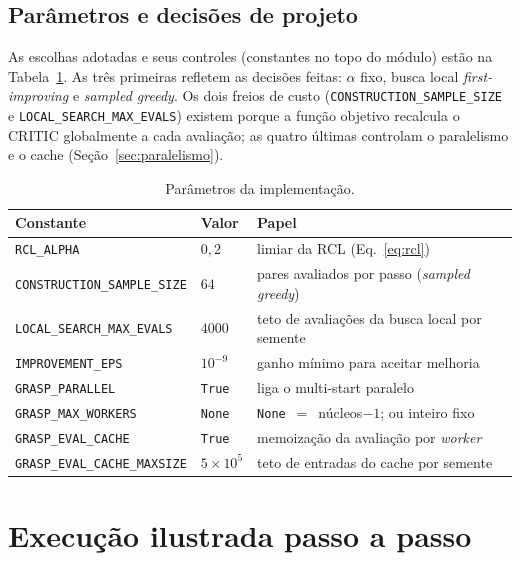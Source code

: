 \documentclass[11pt,a4paper]{article}
\begin{document}
\subsection{Parâmetros e decisões de projeto}

As escolhas adotadas e seus controles (constantes no topo do módulo) estão na
Tabela~\ref{tab:params}. As três primeiras refletem as decisões feitas: $\alpha$
fixo, busca local \emph{first-improving} e \emph{sampled greedy}. Os dois freios de
custo (\texttt{CONSTRUCTION\_SAMPLE\_SIZE} e \texttt{LOCAL\_SEARCH\_MAX\_EVALS})
existem porque a função objetivo recalcula o CRITIC globalmente a cada avaliação;
as quatro últimas controlam o paralelismo e o cache (Seção~\ref{sec:paralelismo}).

\begin{table}[ht]
\centering
\caption{Parâmetros da implementação.}
\label{tab:params}
\begin{tabular}{@{}lll@{}}
\toprule
\textbf{Constante} & \textbf{Valor} & \textbf{Papel} \\
\midrule
\texttt{RCL\_ALPHA}              & $0{,}2$ & limiar da RCL (Eq.~\ref{eq:rcl}) \\
\texttt{CONSTRUCTION\_SAMPLE\_SIZE} & $64$ & pares avaliados por passo (\emph{sampled greedy}) \\
\texttt{LOCAL\_SEARCH\_MAX\_EVALS}  & $4000$ & teto de avaliações da busca local por semente \\
\texttt{IMPROVEMENT\_EPS}        & $10^{-9}$ & ganho mínimo para aceitar melhoria \\
\texttt{GRASP\_PARALLEL}         & \texttt{True} & liga o multi-start paralelo \\
\texttt{GRASP\_MAX\_WORKERS}     & \texttt{None} & \texttt{None}~$=$~núcleos$-1$; ou inteiro fixo \\
\texttt{GRASP\_EVAL\_CACHE}      & \texttt{True} & memoização da avaliação por \emph{worker} \\
\texttt{GRASP\_EVAL\_CACHE\_MAXSIZE} & $5\times10^{5}$ & teto de entradas do cache por semente \\
\bottomrule
\end{tabular}
\end{table}

\section{Execução ilustrada passo a passo}
\label{sec:exemplo}
\end{document}
